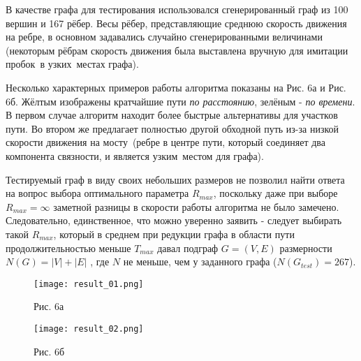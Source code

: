\documentclass[12pt]{article}
\begin{document}
В качестве графа для тестирования использовался сгенерированный граф из 100 вершин и 167 рёбер. Весы рёбер, представляющие среднюю скорость движения на ребре, в основном задавались случайно сгенерированными величинами (некоторым рёбрам скорость движения была выставлена вручную для имитации \glqq пробок\grqq \ в \glqq узких\grqq \ местах графа). 

Несколько характерных примеров работы алгоритма показаны на Рис. 6а и Рис. 6б. Жёлтым изображены кратчайшие пути \textit{по расстоянию}, зелёным - \textit{по времени}. В первом случае алгоритм находит более быстрые альтернативы для участков пути. Во втором же предлагает полностью другой обходной путь из-за низкой скорости движения на \glqq мосту\grqq \ (ребре в центре пути, который соединяет два компонента связности, и является \glqq узким\grqq \ местом для графа).

Тестируемый граф в виду своих небольших размеров не позволил найти ответа на вопрос выбора оптимального параметра $R_{max}$, поскольку даже при выборе $R_{max} = \infty$ заметной разницы в скорости работы алгоритма не было замечено. Следовательно, единственное, что можно уверенно заявить - следует выбирать такой $R_{max}$, который в среднем при редукции графа в области пути продолжительностью меньше $T_{max}$ давал подграф $G=(V,E)$ размерности $N(G) = |V| + |E|$ , где $N$ не меньше, чем у заданного графа ($N(G_{test}) = 267$).
 
\begin{figure}
  \texttt{[image: result\_01.png]}
    \begin{center}
        Рис. 6а
    \end{center}
\endminipage\hfill
{}
  \texttt{[image: result\_02.png]}
        \begin{center}
        Рис. 6б
    \end{center}
\endminipage
\end{figure}
\end{document}
